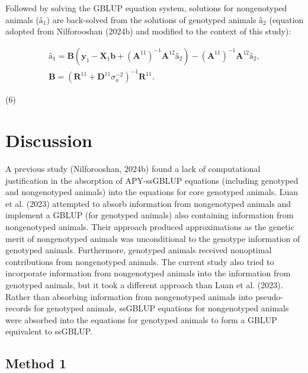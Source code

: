 \documentclass[authordate, empirical]{jote-new-article}
\begin{document}
	Followed by solving the GBLUP equation system, solutions for nongenotyped animals ($\textbf{\^{a}}_1$) are back-solved from the solutions of genotyped animals $\textbf{\^{a}}_2$ (equation adopted from Nilforooshan (2024b) and modified to the context of this study):


\begin{equation*}
\begin{gathered}
		\textbf{\^{a}}_1=\textbf{B}(\textbf{y}_1-\textbf{X}_1 \textbf{\^{b}}+(\textbf{A}^{11} )^{-1} \textbf{A}^{12} \textbf{\^{a}}_2 )-(\textbf{A}^{11} )^{-1} \textbf{A}^{12} \textbf{\^{a}}_2,\\\textbf{B}=(\textbf{R}^{11}+\textbf{D}^{11} \sigma_a^{-2} )^{-1} \textbf{R}^{11}.
\end{gathered}
\end{equation*}

\vspace{-2\baselineskip}
\begin{center}
		(6)
	\end{center}

	\section{Discussion}



	A previous study (Nilforooshan, 2024b) found a lack of computational justification in the absorption of APY-ssGBLUP equations (including genotyped and nongenotyped animals) into the equations for core genotyped animals. Luan et al. (2023) attempted to absorb information from nongenotyped animals and implement a GBLUP (for genotyped animals) also containing information from nongenotyped animals. Their approach produced approximations as the genetic merit of nongenotyped animals was unconditional to the genotype information of genotyped animals. Furthermore, genotyped animals received nonoptimal contributions from nongenotyped animals. The current study also tried to incorporate information from nongenotyped animals into the information from genotyped animals, but it took a different approach than Luan et al. (2023). Rather than absorbing information from nongenotyped animals into pseudo-records for genotyped animals, ssGBLUP equations for nongenotyped animals were absorbed into the equations for genotyped animals to form a GBLUP equivalent to ssGBLUP.



	\subsection{Method 1}
\end{document}
